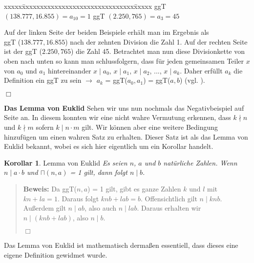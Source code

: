 \documentclass[12pt,a4paper]{article}
\theoremstyle{definition}
\newtheorem{corollar}{Korollar}[subsection]
\begin{document}
\begin{tabbing}
xxxxx\=xxxxxxxxxxxxxxxxxxxxxxxxxxxxxxx\=xxxxx\kill
\> ggT $(138.777, 16.855) = a_{10} = 1$ \> ggT $(2.250, 765) = a_3 = 45$
\end{tabbing}

Auf der linken Seite der beiden Beispiele erhält man im Ergebnis als\\
ggT ($138.777, 16.855$) nach der zehnten Division die Zahl 1. Auf der rechten Seite ist der ggT ($2.250, 765$) die Zahl 45.
Betrachtet man nun diese Divisionkette von oben nach unten so kann man schlussfolgern, dass für jeden gemeinsamen Teiler $x$ von $a_0$ und $a_1$ hintereinander $x \mid a_0$, $x \mid a_1$, $x \mid a_2$, ..., $x \mid a_k$.\newline
Daher erfüllt $a_k$ die Definition ein ggT zu sein $\to$ $a_k$ = ggT($a_0,a_1$) = ggT($a, b$) (vgl. \cite[58--59]{Remmert1995}).
\begin{flushright}
$\Box$
\end{flushright}

\newpage
\textbf{Das Lemma von Euklid}\newline
Sehen wir uns nun nochmals das Negativbeispiel auf Seite \pageref{Negativbeispiel} an.
In diesem konnten wir eine nicht wahre Vermutung erkennen, dass $k \nmid n$ und $k \nmid m$ sofern $k \mid n \cdot m$ gilt.
Wir können aber eine weitere Bedingung hinzufügen um einen wahren Satz zu erhalten.
Dieser Satz ist als das Lemma von Euklid bekannt, wobei es sich hier eigentlich um ein Korollar handelt.\newline

\begin{corollar} Lemma von Euklid\newline
\textit{Es seien $n$, $a$ und $b$ natürliche Zahlen.\newline
Wenn $n \mid a \cdot b$ und $\sqcap(n,a)$ = 1 gilt, dann folgt $n \mid b$.}
\end{corollar}

\begin{quote}
\small
\textbf{Beweis:} Da ggT($n, a$) = 1 gilt, gibt es ganze Zahlen $k$ und $l$ mit $kn + la = 1$.
Daraus folgt $knb + lab = b$.
Offensichtlich gilt $n \mid knb$.
Außerdem gilt $n \mid ab$, also auch $n \mid lab$.\newline
Daraus erhalten wir $n \mid (knb + lab)$, also $n \mid b$.\newline
\autocite[246--247]{Houston2012}
\begin{flushright}
$\Box$
\end{flushright}
\end{quote}
Das Lemma von Euklid ist mathematisch dermaßen essentiell, dass dieses eine eigene Definition gewidmet wurde.
\end{document}
